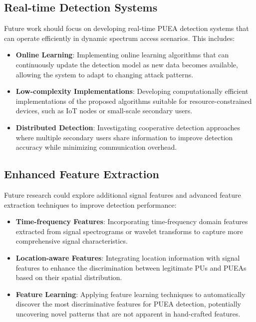 \subsection{Real-time Detection Systems}
Future work should focus on developing real-time PUEA detection systems that can operate efficiently in dynamic spectrum access scenarios. This includes:
\begin{itemize}
    \item \textbf{Online Learning}: Implementing online learning algorithms that can continuously update the detection model as new data becomes available, allowing the system to adapt to changing attack patterns.
    
    \item \textbf{Low-complexity Implementations}: Developing computationally efficient implementations of the proposed algorithms suitable for resource-constrained devices, such as IoT nodes or small-scale secondary users.
    
    \item \textbf{Distributed Detection}: Investigating cooperative detection approaches where multiple secondary users share information to improve detection accuracy while minimizing communication overhead.
\end{itemize}

\subsection{Enhanced Feature Extraction}
Future research could explore additional signal features and advanced feature extraction techniques to improve detection performance:
\begin{itemize}
    \item \textbf{Time-frequency Features}: Incorporating time-frequency domain features extracted from signal spectrograms or wavelet transforms to capture more comprehensive signal characteristics.
    
    \item \textbf{Location-aware Features}: Integrating location information with signal features to enhance the discrimination between legitimate PUs and PUEAs based on their spatial distribution.
    
    \item \textbf{Feature Learning}: Applying feature learning techniques to automatically discover the most discriminative features for PUEA detection, potentially uncovering novel patterns that are not apparent in hand-crafted features.
\end{itemize}

